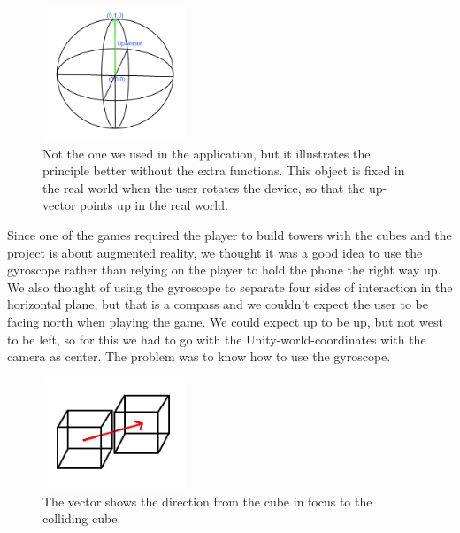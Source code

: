 \begin{figure}
        \capstart
        \vspace{-20pt}
        \centering
        \includegraphics[width=0.38\textwidth]{images/GyroObjectModel.png}
        \vspace{-20pt}
        \caption[Model of the game-object used to get the direction up]{Not the one we used in the application, but it illustrates the principle better without the extra functions. This object is fixed in the real world when the user rotates the device, so that the up-vector points up in the real world.} 
        \label{fig:Gyro_model} 
        \vspace{-10pt}
\end{figure}

Since one of the games required the player to build towers with the cubes and the project is about augmented reality, we thought it was a good idea to use the gyroscope rather than relying on the player to hold the phone the right way up. We also thought of using the gyroscope to separate four sides of interaction in the horizontal plane, but that is a compass and we couldn't expect the user to be facing north when playing the game. We could expect up to be up, but not west to be left, so for this we had to go with the Unity-world-coordinates with the camera as center. The problem was to know how to use the gyroscope.\\

\begin{figure}
        \capstart
        \vspace{-20pt}
        \centering
        \includegraphics[width=0.38\textwidth]{images/CollisionDirectionObject.png}
        \vspace{-20pt}
        \caption[Model of the collision direction vector]{The vector shows the direction from the cube in focus to the colliding cube.} 
        \label{fig:Collision_Direction_model} 
        \vspace{-10pt}
\end{figure}

